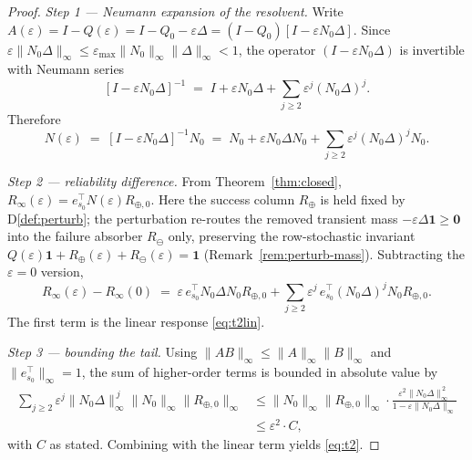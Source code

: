 \iffalse
\begin{proof}
\emph{Step 1 — Neumann expansion of the resolvent.}
Write $A(\varepsilon)=I-Q(\varepsilon)=I-Q_0-\varepsilon\Delta=(I-Q_0)[I-\varepsilon N_0\Delta]$.
Since $\varepsilon\|N_0\Delta\|_\infty\le\varepsilon_{\max}\|N_0\|_\infty\|\Delta\|_\infty<1$,
the operator $(I-\varepsilon N_0\Delta)$ is invertible with Neumann series
\[
[I-\varepsilon N_0\Delta]^{-1} \;=\; I + \varepsilon N_0\Delta + \sum_{j\ge 2}\varepsilon^{j}(N_0\Delta)^{j}.
\]
Therefore
\begin{equation}
N(\varepsilon) \;=\; [I-\varepsilon N_0\Delta]^{-1}N_0
\;=\; N_0+\varepsilon N_0\Delta N_0 + \sum_{j\ge 2}\varepsilon^{j}(N_0\Delta)^{j}N_0.
\label{eq:neumann}
\end{equation}

\emph{Step 2 — reliability difference.}
From Theorem~\ref{thm:closed},
$R_\infty(\varepsilon)=e_{s_0}^\top N(\varepsilon)R_{\oplus,0}$.
Here the success column $R_{\oplus}$ is held fixed by
D\ref{def:perturb}; the perturbation re-routes the removed transient
mass $-\varepsilon\Delta\mathbf{1}\ge\mathbf{0}$ into the failure
absorber $R_{\ominus}$ only, preserving the row-stochastic invariant
$Q(\varepsilon)\mathbf{1}+R_\oplus(\varepsilon)+R_\ominus(\varepsilon)=\mathbf{1}$
(Remark~\ref{rem:perturb-mass}). Subtracting the $\varepsilon=0$ version,
\begin{equation}
R_\infty(\varepsilon)-R_\infty(0)
\;=\; \varepsilon\,e_{s_0}^\top N_0\Delta N_0 R_{\oplus,0}
 + \sum_{j\ge 2}\varepsilon^{j}\,e_{s_0}^\top(N_0\Delta)^{j}N_0 R_{\oplus,0}.
\label{eq:diff}
\end{equation}
The first term is the linear response \eqref{eq:t2lin}.

\emph{Step 3 — bounding the tail.}
Using $\|AB\|_\infty\le\|A\|_\infty\|B\|_\infty$ and $\|e_{s_0}^\top\|_\infty=1$,
the sum of higher-order terms is bounded in absolute value by
\begin{align*}
\sum_{j\ge 2}\varepsilon^{j}\|N_0\Delta\|_\infty^{\,j}\|N_0\|_\infty\|R_{\oplus,0}\|_\infty
&\le \|N_0\|_\infty\|R_{\oplus,0}\|_\infty \cdot \frac{\varepsilon^{2}\|N_0\Delta\|_\infty^{\,2}}{1-\varepsilon\|N_0\Delta\|_\infty}\\
&\le \varepsilon^{2}\cdot C,
\end{align*}
with $C$ as stated. Combining with the linear term yields \eqref{eq:t2}.
\end{proof}

